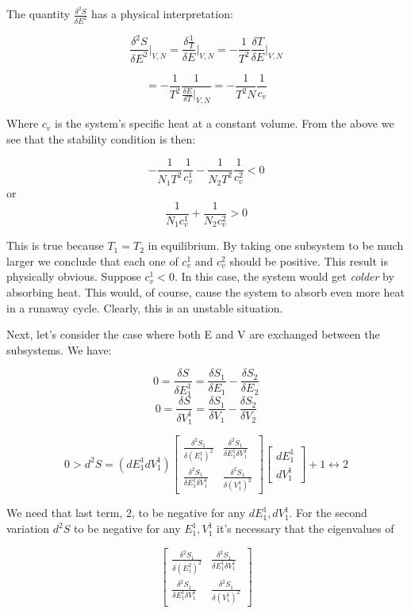 \documentclass{article}
\newcommand{\pardif}[2]{\frac{\delta#1}{\delta#2}}
\newcommand{\secpardif}[2]{\frac{\delta^{2}#1}{\delta#2^{2}}}
\newcommand{\thermdif}[4]{\frac{\delta#1}{\delta#2}\vert_{#3,#4}}
\newcommand{\secthermdif}[4]{\frac{\delta^{2}#1}{\delta#2^{2}}\vert_{#3,#4}}
\begin{document}
The quantity $\frac{\delta^{2}S}{\delta E^{2}}$ has a physical interpretation:

$$\secthermdif{S}{E}{V}{N}=\thermdif{\frac{1}{T}}{E}{V}{N}=-\frac{1}{T^{2}}\thermdif{T}{E}{V}{N}$$

$$=-\frac{1}{T^{2}}\frac{1}{\thermdif{E}{T}{V}{N}}=-\frac{1}{T^{2}N}\frac{1}{c_{v}}$$

Where $c_{v}$ is the system's specific heat at a constant volume.  From the above we see that the stability condition is then:

$$-\frac{1}{N_{1}T^{2}}\frac{1}{c_{v}^{1}}-\frac{1}{N_{2}T^{2}}\frac{1}{c_{v}^{2}}<0$$
or
$$\frac{1}{N_{1}c_{v}^{1}}+\frac{1}{N_{2}c_{v}^{2}}>0$$

This is true because $T_{1}=T_{2}$ in equilibrium.  By taking one subsystem to be much larger we conclude that each one of $c_{v}^{1}$ and $c_{v}^{2}$ should be positive.  This result is physically obvious.  Suppose $c_{v}^{1}<0$.  In this case, the system would get \textit{colder} by absorbing heat.  This would, of course, cause the system to absorb even more heat in a runaway cycle.  Clearly, this is an unstable situation.  

Next, let's consider the case where both E and V are exchanged between the subsystems.  We have:

$$0=\pardif{S}{E_{1}^{1}}=\pardif{S_{1}}{E_{1}}-\pardif{S_{2}}{E_{2}}$$
$$0=\pardif{S}{V_{1}^{1}}=\pardif{S_{1}}{V_{1}}-\pardif{S_{2}}{V_{2}}$$

$$0>d^{2}S=(dE_{1}^{1}dV_{1}^{1}) \left[ \begin{smallmatrix} \secpardif{S_{1}}{(E_{1}^{1})}&\frac{\delta^{2}S_{1}}{\delta E_{1}^{1}\delta V_{1}^{1}}\\ \frac{\delta^{2}S_{1}}{\delta E_{1}^{1}\delta V_{1}^{1}}&\secpardif{S_{1}}{(V_{1}^{1})} \end{smallmatrix} \right] 
\begin{bmatrix}
	dE_{1}^{1} \\
	dV_{1}^{1} 
\end{bmatrix}
+1\leftrightarrow2$$

We need that last term, 2, to be negative for any $dE_{1}^{1},dV_{1}^{1}$.  For the second variation $d^{2}S$ to be negative for any $E_{1}^{1},V_{1}^{1}$ it's necessary that the eigenvalues of 

$$\left[ \begin{smallmatrix} \secpardif{S_{1}}{(E_{1}^{2})}&\frac{\delta^{2}S_{1}}{\delta E_{1}^{1}\delta V_{1}^{1}}\\ \frac{\delta^{2}S_{1}}{\delta E_{1}^{1}\delta V_{1}^{1}}&\secpardif{S_{1}}{(V_{1}^{1})} \end{smallmatrix} \right]$$
\end{document}
